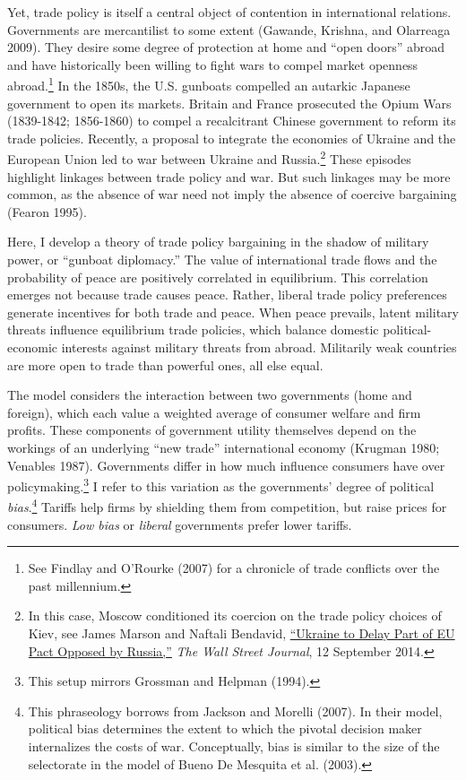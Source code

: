 \documentclass{puthesis}
\begin{document}
Yet, trade policy is itself a central object of contention in
international relations. Governments are mercantilist to some extent
(Gawande, Krishna, and Olarreaga 2009). They desire some degree of
protection at home and ``open doors'' abroad and have historically been
willing to fight wars to compel market openness abroad.\footnote{See
  Findlay and O'Rourke (2007) for a chronicle of trade conflicts over
  the past millennium.} In the 1850s, the U.S. gunboats compelled an
autarkic Japanese government to open its markets. Britain and France
prosecuted the Opium Wars (1839-1842; 1856-1860) to compel a
recalcitrant Chinese government to reform its trade policies. Recently,
a proposal to integrate the economies of Ukraine and the European Union
led to war between Ukraine and Russia.\footnote{In this case, Moscow
  conditioned its coercion on the trade policy choices of Kiev, see
  James Marson and Naftali Bendavid,
  \href{https://www.wsj.com/articles/poroshenko-says-eu-agreement-to-be-ratified-next-week-1410519009}{``Ukraine
  to Delay Part of EU Pact Opposed by Russia,''} \emph{The Wall Street
  Journal}, 12 September 2014.} These episodes highlight linkages
between trade policy and war. But such linkages may be more common, as
the absence of war need not imply the absence of coercive bargaining
(Fearon 1995).

Here, I develop a theory of trade policy bargaining in the shadow of
military power, or ``gunboat diplomacy.'' The value of international
trade flows and the probability of peace are positively correlated in
equilibrium. This correlation emerges not because trade causes peace.
Rather, liberal trade policy preferences generate incentives for both
trade and peace. When peace prevails, latent military threats influence
equilibrium trade policies, which balance domestic political-economic
interests against military threats from abroad. Militarily weak
countries are more open to trade than powerful ones, all else equal.

The model considers the interaction between two governments (home and
foreign), which each value a weighted average of consumer welfare and
firm profits. These components of government utility themselves depend
on the workings of an underlying ``new trade'' international economy
(Krugman 1980; Venables 1987). Governments differ in how much influence
consumers have over policymaking.\footnote{This setup mirrors Grossman
  and Helpman (1994).} I refer to this variation as the governments'
degree of political \emph{bias}.\footnote{This phraseology borrows from
  Jackson and Morelli (2007). In their model, political bias determines
  the extent to which the pivotal decision maker internalizes the costs
  of war. Conceptually, bias is similar to the size of the selectorate
  in the model of Bueno De Mesquita et al. (2003).} Tariffs help firms
by shielding them from competition, but raise prices for consumers.
\emph{Low bias} or \emph{liberal} governments prefer lower tariffs.
\end{document}
